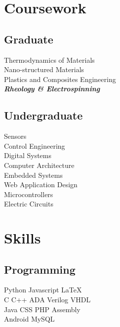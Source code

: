 \documentclass[]{deedy-resume-openfont}
\begin{document}
\begin{minipage}[t]{0.34\textwidth}

\section{Coursework}
\subsection{Graduate}
Thermodynamics of Materials \\
Nano-structured Materials \\
Plastics and Composites Engineering \\
{\footnotesize \textit{\textbf{Rheology \& Electrospinning}}} \\
\sectionsep

\subsection{Undergraduate}
Sensors \\
Control Engineering \\
Digital Systems \\
Computer Architecture \\
Embedded Systems \\
Web Application Design \\
Microcontrollers \\
Electric Circuits \\


\section{Skills}
\subsection{Programming}
Python \textbullet{} Javascript \textbullet{} \LaTeX\ \\
C \textbullet{} C++ \textbullet{} ADA \textbullet{} Verilog \textbullet{} VHDL \\
Java \textbullet{} CSS \textbullet{} PHP \textbullet{} Assembly \\
Android \textbullet{} MySQL
\sectionsep

%
%

\end{minipage} 
\end{document}
